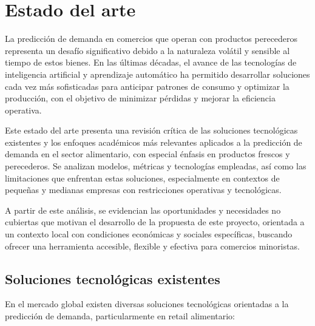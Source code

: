 \newpage %

\section{Estado del arte}

La predicción de demanda en comercios que operan con productos perecederos representa un desafío significativo debido a la naturaleza volátil y sensible al tiempo de estos bienes. En las últimas décadas, el avance de las tecnologías de inteligencia artificial y aprendizaje automático ha permitido desarrollar soluciones cada vez más sofisticadas para anticipar patrones de consumo y optimizar la producción, con el objetivo de minimizar pérdidas y mejorar la eficiencia operativa.

Este estado del arte presenta una revisión crítica de las soluciones tecnológicas existentes y los enfoques académicos más relevantes aplicados a la predicción de demanda en el sector alimentario, con especial énfasis en productos frescos y perecederos. Se analizan modelos, métricas y tecnologías empleadas, así como las limitaciones que enfrentan estas soluciones, especialmente en contextos de pequeñas y medianas empresas con restricciones operativas y tecnológicas.

A partir de este análisis, se evidencian las oportunidades y necesidades no cubiertas que motivan el desarrollo de la propuesta de este proyecto, orientada a un contexto local con condiciones económicas y sociales específicas, buscando ofrecer una herramienta accesible, flexible y efectiva para comercios minoristas.


\subsection{Soluciones tecnológicas existentes}

En el mercado global existen diversas soluciones tecnológicas orientadas a la predicción de demanda, particularmente en retail alimentario:

